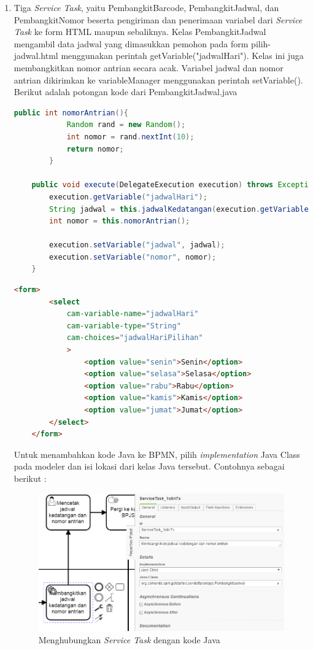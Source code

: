 \begin{enumerate}
			
	\item Tiga \textit{Service Task}, yaitu PembangkitBarcode, PembangkitJadwal, dan PembangkitNomor beserta pengiriman dan penerimaan variabel dari \textit{Service Task} ke form HTML maupun sebaliknya. Kelas PembangkitJadwal mengambil data jadwal yang dimasukkan pemohon pada form pilih-jadwal.html menggunakan perintah getVariable("jadwalHari"). Kelas ini juga membangkitkan nomor antrian secara acak. Variabel jadwal dan nomor antrian dikirimkan ke variableManager menggunakan perintah setVariable(). Berikut adalah potongan kode dari PembangkitJadwal.java
		
	\begin{lstlisting}[language=Java,basicstyle=\tiny,caption=PembangkitJadwal.java]
		public int nomorAntrian(){
			Random rand = new Random();
			int nomor = rand.nextInt(10);
			return nomor;
		}
	
	public void execute(DelegateExecution execution) throws Exception {
		execution.getVariable("jadwalHari");
		String jadwal = this.jadwalKedatangan(execution.getVariable("jadwalHari"));
		int nomor = this.nomorAntrian();

		execution.setVariable("jadwal", jadwal);
		execution.setVariable("nomor", nomor);
	}
	\end{lstlisting}
	
	\begin{lstlisting}[language=html,basicstyle=\tiny,caption=pilih-jadwal.html]
		<form>
		<select 
			cam-variable-name="jadwalHari"
			cam-variable-type="String"
	        cam-choices="jadwalHariPilihan"
	        >
		  		<option value="senin">Senin</option>
		  		<option value="selasa">Selasa</option>
		  		<option value="rabu">Rabu</option>
		  		<option value="kamis">Kamis</option>
		  		<option value="jumat">Jumat</option>
		</select>
	</form>
	\end{lstlisting}
	Untuk menambahkan kode Java ke BPMN, pilih \textit{implementation} Java Class pada modeler dan isi lokasi dari kelas Java tersebut. Contohnya sebagai berikut :
	
		\begin{figure}[H]
			\centering
			\includegraphics[scale=0.6]{Gambar/Bab-3/Kasus2/2servicetask}
			\caption{Menghubungkan \textit{Service Task} dengan kode Java} 
			\label{fig:pendaftaranBPJS_servicetask}
	\end{figure}
	
\end{enumerate}





